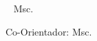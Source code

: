 \renewcommand{\imprimirfolhaderosto}{
    \centering
    \ABNTEXchapterfont \MakeUppercase{\textbf{\imprimirautor}}
    
    \vspace*{\fill}\vspace*{\fill}
    
    \ABNTEXchapterfont \MakeUppercase{\textbf{\imprimirtitulo}}
    
    \vspace*{\fill}
    
    \normalfont
    
    \begin{flushright}{}{
				\hspace{.45\textwidth}
	
				\begin{minipage}{.55\textwidth}
					\SingleSpacing
					\imprimirpreambulo
					
					\vspace*{.7cm}

					{\imprimirorientadorRotulo~ Msc. \imprimirorientador\par}
					Co-Orientador: Msc. {\imprimircoorientador}
				\end{minipage}
	
				\vspace*{\fill}
			}
		\end{flushright}
    
    \vspace*{\fill}

	\ABNTEXchapterfont \MakeUppercase{\textbf{\imprimirlocal}}
	\par
	\ABNTEXchapterfont \MakeUppercase{\textbf{\imprimirdata}}

}
\newpage
\imprimirfolhaderosto